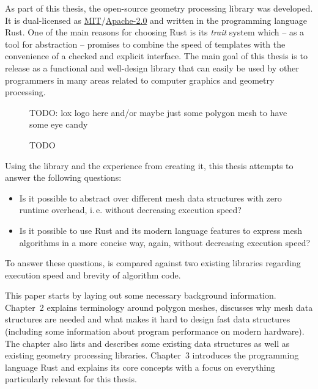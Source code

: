 \vspace{1cm}

As part of this thesis, the open-source geometry processing library  was developed.
It is dual-licensed as \hyperlink{mit}{MIT}/\hyperlink{apache2}{Apache-2.0} and written in the programming language Rust.
One of the main reasons for choosing Rust is its \emph{trait} system which -- as a tool for abstraction -- promises to combine the speed of \cpp templates with the convenience of a checked and explicit interface.
The main goal of this thesis is to release  as a functional and well-design library that can easily be used by other programmers in many areas related to computer graphics and geometry processing.

\begin{figure}[b]
  \centering
  TODO: lox logo here and/or maybe just some polygon mesh to have some eye candy
  \caption{TODO}
\end{figure}

\newpage

Using the library  and the experience from creating it, this thesis attempts to answer the following questions:

\begin{itemize}
  \item Is it possible to abstract over different mesh data structures with zero runtime overhead, i.\,e. without decreasing execution speed?
  \item Is it possible to use Rust and its modern language features to express mesh algorithms in a more concise way, again, without decreasing execution speed?
\end{itemize}

To answer these questions,  is compared against two existing \cpp libraries regarding execution speed and brevity of algorithm code.

\vspace{1cm}

This paper starts by laying out some necessary background information.
Chapter~2 explains terminology around polygon meshes, discusses why mesh data structures are needed and what makes it hard to design fast data structures (including some information about program performance on modern hardware).
The chapter also lists and describes some existing data structures as well as existing geometry processing libraries.
Chapter~3 introduces the programming language Rust and explains its core concepts with a focus on everything particularly relevant for this thesis.

